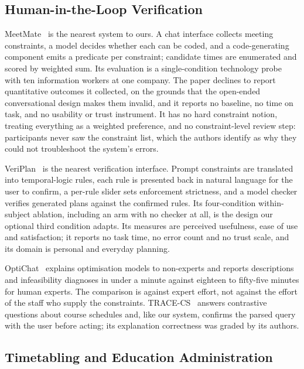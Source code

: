 \documentclass[acmsmall,screen,review,anonymous]{acmart}
\begin{document}
\subsection{Human-in-the-Loop Verification}

MeetMate~\cite{lawless2024meetmate} is the nearest system to ours. A chat
interface collects meeting constraints, a model decides whether each can be
coded, and a code-generating component emits a predicate per constraint;
candidate times are enumerated and scored by weighted sum. Its evaluation is a
single-condition technology probe with ten information workers at one company.
The paper declines to report quantitative outcomes it collected, on the
grounds that the open-ended conversational design makes them invalid, and it
reports no baseline, no time on task, and no usability or trust instrument. It
has no hard constraint notion, treating everything as a weighted preference,
and no constraint-level review step: participants never saw the constraint
list, which the authors identify as why they could not troubleshoot the
system's errors.

VeriPlan~\cite{lee2025veriplan} is the nearest verification interface. Prompt
constraints are translated into temporal-logic rules, each rule is presented
back in natural language for the user to confirm, a per-rule slider sets
enforcement strictness, and a model checker verifies generated plans against
the confirmed rules. Its four-condition within-subject ablation, including an
arm with no checker at all, is the design our optional third condition adapts.
Its measures are perceived usefulness, ease of use and satisfaction; it
reports no task time, no error count and no trust scale, and its domain is
personal and everyday planning.

OptiChat~\cite{chen2026optichat} explains optimisation models to non-experts
and reports descriptions and infeasibility diagnoses in under a minute against
eighteen to fifty-five minutes for human experts. The comparison is against
expert effort, not against the effort of the staff who supply the constraints.
TRACE-CS~\cite{vasileiou2025tracecs} answers contrastive questions about
course schedules and, like our system, confirms the parsed query with the user
before acting; its explanation correctness was graded by its authors.

\subsection{Timetabling and Education Administration}
\end{document}
